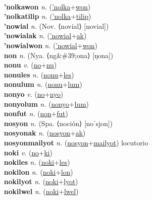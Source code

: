  \label{'nolkaak} \\
\textbf{'nolkawon} \textit{n.} (\hyperref['nolka]{'nolka}+\hyperref[won]{won})
 \label{'nolkawon} \\
\textbf{'nolkatilip} \textit{n.} (\hyperref['nolka]{'nolka}+\hyperref[tilip]{tilip})
 \label{'nolkatilip} \\
\textbf{'nowial} \textit{n.} (Nov. ⟨novial⟩ [novial])
 \label{'nowial} \\
\textbf{'nowialak} \textit{n.} (\hyperref['nowial]{'nowial}+\hyperref[ak]{ak})
 \label{'nowialak} \\
\textbf{'nowialwon} \textit{n.} (\hyperref['nowial]{'nowial}+\hyperref[won]{won})
 \label{'nowialwon} \\
\textbf{non} \textit{n.} (Nya. ⟨ng\&\#39;ona⟩ [ŋona])
 \label{non} \\
\textbf{nonu} \textit{v.} (\hyperref[no]{no}+\hyperref[nu]{nu})
 \label{nonu} \\
\textbf{nonules} \textit{n.} (\hyperref[nonu]{nonu}+\hyperref[les]{les})
 \label{nonules} \\
\textbf{nonulum} \textit{n.} (\hyperref[nonu]{nonu}+\hyperref[lum]{lum})
 \label{nonulum} \\
\textbf{nonyo} \textit{v.} (\hyperref[no]{no}+\hyperref[nyo]{nyo})
 \label{nonyo} \\
\textbf{nonyolum} \textit{n.} (\hyperref[nonyo]{nonyo}+\hyperref[lum]{lum})
 \label{nonyolum} \\
\textbf{nonfut} \textit{n.} (\hyperref[non]{non}+\hyperref[fut]{fut})
 \label{nonfut} \\
\textbf{nosyon} \textit{n.} (Spa. ⟨noción⟩ [noˈsjon])
 \label{nosyon} \\
\textbf{nosyonak} \textit{n.} (\hyperref[nosyon]{nosyon}+\hyperref[ak]{ak})
 \label{nosyonak} \\
\textbf{nosyonmailyot} \textit{n.} (\hyperref[nosyon]{nosyon}+\hyperref[mailyot]{mailyot})
locutorio \label{nosyonmailyot} \\
\textbf{noki} \textit{v.} (\hyperref[no]{no}+\hyperref[ki]{ki})
 \label{noki} \\
\textbf{nokiles} \textit{n.} (\hyperref[noki]{noki}+\hyperref[les]{les})
 \label{nokiles} \\
\textbf{nokilon} \textit{n.} (\hyperref[noki]{noki}+\hyperref[lon]{lon})
 \label{nokilon} \\
\textbf{nokilyot} \textit{n.} (\hyperref[noki]{noki}+\hyperref[lyot]{lyot})
 \label{nokilyot} \\
\textbf{nokilwel} \textit{n.} (\hyperref[noki]{noki}+\hyperref[lwel]{lwel})
